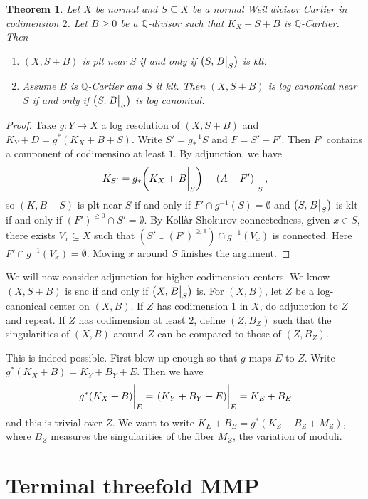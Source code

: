 \documentclass[leqno, openany]{memoir}
\newtheorem{thm}{Theorem}[section]
\theoremstyle{definition}
\theoremstyle{remark}
\theoremstyle{plain}
\theoremstyle{definition}
\theoremstyle{remark}
\newcommand{\Q}{\mathbb{Q}}
\begin{document}
\begin{thm}
    Let $X$ be normal and $S \subseteq X$ be a normal Weil divisor Cartier in codimension $2$. Let $B \geq 0$ be a $\Q$-divisor such that $K_X + S + B$ is $\Q$-Cartier. Then
    \begin{enumerate}
        \item $(X, S+B)$ is plt near $S$ if and only if $\qty(S, \eval{B}_S)$ is klt.
        \item Assume $B$ is $\Q$-Cartier and $S$ it klt. Then $(X, S+B)$ is log canonical near $S$ if and only if $\qty(S, \eval{B}_S)$ is log canonical.
    \end{enumerate}
\end{thm}

\begin{proof}
    Take $g \colon Y \to X$ a log resolution of $(X, S+B)$ and $K_Y + D = g^*(K_X+B+S)$. Write $S' = g_*^{-1} S$ and $F = S' + F'$. Then $F'$ contains a component of codimensino at least $1$. By adjunction, we have 
    \[ K_{S'} = g_* \qty(K_X + \eval{B}_S) + \eval{(A-F')}_{S}, \]
    so $(K, B+S)$ is plt near $S$ if and only if $F' \cap g^{-1}(S) = \emptyset$ and $\qty(S, \eval{B}_S)$ is klt if and only if ${(F')}^{\geq 0} \cap S' = \emptyset$. By Koll\`ar-Shokurov connectedness, given $x \in S$, there exists $V_x \subseteq X$ such that $(S' \cup {(F')}^{\geq 1}) \cap g^{-1}(V_x)$ is connected. Here $F' \cap g^{-1}(V_x) = \emptyset$. Moving $x$ around $S$ finishes the argument. 
\end{proof}

We will now consider adjunction for higher codimension centers. We know $(X, S+B)$ is snc if and only if $\qty(X, \eval{B}_S)$ is. For $(X, B)$, let $Z$ be a log-canonical center on $(X, B)$. If $Z$ has codimension $1$ in $X$, do adjunction to $Z$ and repeat. If $Z$ has codimension at least $2$, define $(Z, B_Z)$ such that the singularities of $(X, B)$ around $Z$ can be compared to those of $(Z, B_Z)$.

This is indeed possible. First blow up enough so that $g$ maps $E$ to $Z$. Write $g^*(K_X + B) = K_Y + B_Y + E$. Then we have
\[ \eval{g^*(K_X + B)}_E = \eval{ ( K_Y + B_Y + E ) }_E = K_E + B_E \]
and this is trivial over $Z$. We want to write $K_E + B_E = g^*(K_Z + B_Z + M_Z)$, where $B_Z$ measures the singularities of the fiber $M_Z$, the variation of moduli.

\section{Terminal threefold MMP}%
\label{sec:terminal_threefold_mmp}
\end{document}
